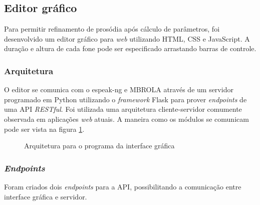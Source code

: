 \subsection{Editor gráfico}
Para permitir refinamento de prosódia após cálculo de parâmetros, foi
desenvolvido um editor gráfico para \emph{web} utilizando HTML, CSS e
JavaScript. A duração e altura de cada fone pode ser especificado arrastando
barras de controle.
\subsubsection{Arquitetura}
 O editor se comunica com o espeak-ng e MBROLA através de um
servidor programado em Python utilizando o \emph{framework} Flask para prover
\emph{endpoints} de uma API \emph{RESTful}. Foi utilizada uma arquitetura cliente-servidor \cite{rest} comumente observada em aplicações \emph{web} atuais. A maneira como os módulos se comunicam pode ser vista na figura \ref{fig:arch}.

\begin{figure}[!htbp]
\centering
{}
\caption{Arquitetura para o programa da interface gráfica}
\label{fig:arch}
\end{figure}

\subsubsection{\emph{Endpoints}}
Foram criados dois \emph{endpoints} para a API, possibilitando a comunicação entre
interface gráfica e servidor.

